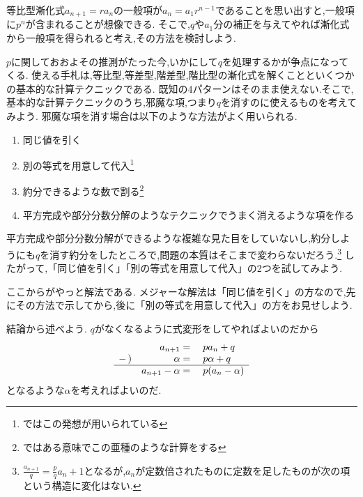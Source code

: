   等比型漸化式$a_{n+1}=ra_n$の一般項が$a_n=a_1r^{n-1}$であることを思い出すと,一般項に$p^n$が含まれることが想像できる.
  そこで,$q$や$a_1$分の補正を与えてやれば漸化式から一般項を得られると考え,その方法を検討しよう.
  
  $p$に関しておおよその推測がたった今,いかにして$q$を処理するかが争点になってくる.
  使える手札は,等比型,等差型,階差型,階比型の漸化式を解くことといくつかの基本的な計算テクニックである.
  既知の4パターンはそのまま使えない.そこで,基本的な計算テクニックのうち,邪魔な項,つまり$q$を消すのに使えるものを考えてみよう.
  邪魔な項を消す場合は以下のような方法がよく用いられる.
  \begin{enumerate}
    \item 同じ値を引く
    \item 別の等式を用意して代入\footnote{ではこの発想が用いられている}
    \item 約分できるような数で割る\footnote{ではある意味でこの亜種のような計算をする}
    \item 平方完成や部分分数分解のようなテクニックでうまく消えるような項を作る
  \end{enumerate}
  平方完成や部分分数分解ができるような複雑な見た目をしていないし,約分しようにも$q$を消す約分をしたところで,問題の本質はそこまで変わらないだろう.\footnote{$\frac{a_{n+1}}{q}=\frac{p}{q}a_{n}+1$となるが,$a_n$が定数倍されたものに定数を足したものが次の項という構造に変化はない.}
  したがって,「同じ値を引く」「別の等式を用意して代入」の2つを試してみよう.
  
  ここからがやっと解法である.
  メジャーな解法は「同じ値を引く」の方なので,先にその方法で示してから,後に「別の等式を用意して代入」の方をお見せしよう.

  
  結論から述べよう.
  $q$がなくなるように式変形をしてやればよいのだから
  \[
    \begin{array}{rrl}
      &a_{n+1}={}&pa_n+q\\
      -\,)&\alpha={}&p\alpha+q\\ \hline
      &a_{n+1}-\alpha={}&p(a_n-\alpha)
    \end{array}
  \]
  となるような$\alpha$を考えればよいのだ.
  
